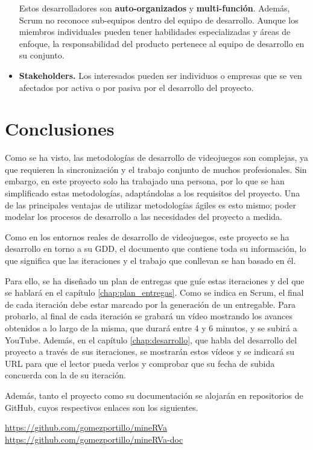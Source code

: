 \begin{itemize}
Estos desarrolladores son \textbf{auto-organizados} y \textbf{multi-función}. Además, Scrum no reconoce sub-equipos dentro del equipo de desarrollo. Aunque los miembros individuales pueden tener habilidades especializadas y áreas de enfoque, la responsabilidad del producto pertenece al equipo de desarrollo en su conjunto.

\item \textbf{Stakeholders.} Los interesados pueden ser individuos o empresas que se ven afectados por activa o por pasiva por el desarrollo del proyecto.

\end{itemize}

\section{Conclusiones}

Como se ha visto, las metodologías de desarrollo de videojuegos son complejas, ya que requieren la sincronización y el trabajo conjunto de muchos profesionales. Sin embargo, en este proyecto solo ha trabajado una persona, por lo que se han simplificado estas metodologías, adaptándolas a los requisitos del proyecto. Una de las principales ventajas de utilizar metodologías ágiles es esto mismo; poder modelar los procesos de desarrollo a las necesidades del proyecto a medida. 

Como en los entornos reales de desarrollo de videojuegos, este proyecto se ha desarrollo en torno a su \acs{GDD}, el documento que contiene toda su información, lo que significa que las iteraciones y el trabajo que conllevan se han basado en él.

Para ello, se ha diseñado un plan de entregas que guíe estas iteraciones y del que se hablará en el capítulo \ref{chap:plan_entregas}. Como se indica en Scrum, el final de cada iteración debe estar marcado por la generación de un entregable. Para probarlo, al final de cada iteración se grabará un vídeo mostrando los avances obtenidos a lo largo de la misma, que durará entre 4 y 6 minutos, y se subirá a YouTube. Además, en el capítulo \ref{chap:desarrollo}, que habla del desarrollo del proyecto a través de sus iteraciones, se mostrarán estos vídeos y se indicará su URL para que el lector pueda verlos y comprobar que su fecha de subida concuerda con la de su iteración.

Además, tanto el proyecto como su documentación se alojarán en repositorios de GitHub, cuyos respectivos enlaces son los siguientes.

\begin{center}
    \url{https://github.com/gomezportillo/mineRVa}
    \url{https://github.com/gomezportillo/mineRVa-doc}
\end{center}
